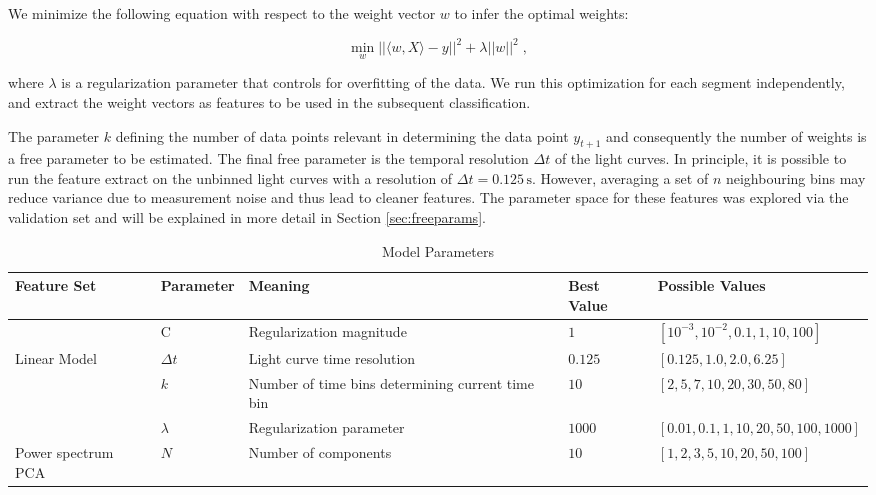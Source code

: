 \documentclass[fleqn,usenatbib]{mnras}
\begin{document}
We minimize the following equation with respect to the weight vector $w$ to infer the optimal weights:

\begin{equation}
\min_w ||\langle w, X \rangle - y||^2 + \lambda ||w||^2 \; ,
\end{equation}

\noindent where $\lambda$ is a regularization parameter that controls for overfitting of the data. We run this optimization for each segment independently, and extract the weight vectors as features to be used in the subsequent classification.

The parameter $k$ defining the number of data points relevant in determining the data point $y_{t+1}$ and consequently the number of weights is a free parameter to be estimated. The final free parameter is the temporal resolution $\Delta t$ of the light curves. In principle, it is possible to run the feature extract on the unbinned light curves with a resolution of $\Delta t = 0.125\,\mathrm{s}$. However, averaging a set of $n$ neighbouring bins may reduce variance due to measurement noise and thus lead to cleaner features. The parameter space for these features was explored via the validation set and will be explained in more detail in Section \ref{sec:freeparams}.

\begin{table}[hbtp]
\renewcommand{\arraystretch}{1.3}
\footnotesize
\caption{Model Parameters}
\begin{threeparttable} 
\begin{tabularx}{\textwidth}{p{2.0cm}p{2.0cm}p{5.0cm}p{1.0cm}p{6.0cm}}
\toprule
\bf{Feature Set} & \bf{Parameter} & \bf{Meaning} & Best Value &  \bf{Possible Values} \\ \midrule
		& C & Regularization magnitude & $1$ & $[10^{-3}, 10^{-2}, 0.1, 1, 10, 100]$ \\ \midrule
 Linear Model & $\Delta t$ & Light curve time resolution & $0.125$ & $[0.125, 1.0, 2.0, 6.25]$ \\
		& $k$ & Number of time bins determining current time bin & $10$ & $[2, 5, 7, 10, 20, 30, 50, 80]$ \\
		& $\lambda$ & Regularization parameter & $1000$ & $[0.01, 0.1, 1, 10, 20, 50, 100, 1000]$ \\ \midrule
Power spectrum PCA & $N$ & Number of components & $10$ & $[1,2,3,5,10,20,50,100]$ \\

 \bottomrule
\end{tabularx}
   \begin{tablenotes}
      \item{}
\end{tablenotes}
\end{threeparttable}
\label{table:parameters}
\end{table}
\end{document}
